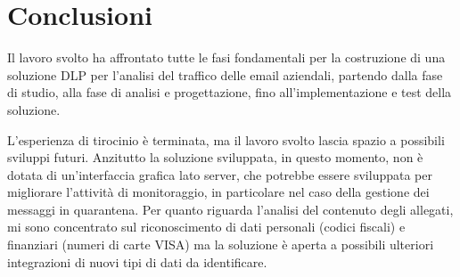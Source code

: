 \chapter{Conclusioni}

Il lavoro svolto ha affrontato tutte le fasi fondamentali per la costruzione di una 
soluzione DLP per l'analisi del traffico delle email aziendali, partendo dalla fase di 
studio, alla fase di analisi e progettazione, fino all'implementazione e test della soluzione.

L'esperienza di tirocinio è terminata, ma il lavoro svolto lascia spazio a possibili sviluppi futuri.
Anzitutto la soluzione sviluppata, in questo momento, non è dotata di un'interfaccia grafica lato server,
che potrebbe essere sviluppata per migliorare l'attività di monitoraggio, in particolare nel caso della 
gestione dei messaggi in quarantena.
Per quanto riguarda l'analisi del contenuto degli allegati, mi sono concentrato sul riconoscimento di dati personali 
(codici fiscali) e finanziari (numeri di carte VISA) ma la soluzione è aperta a possibili ulteriori integrazioni di nuovi
tipi di dati da identificare. 
